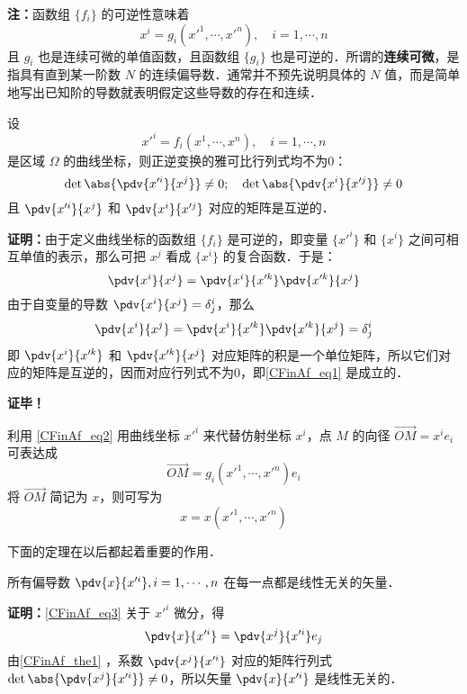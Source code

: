 \textbf{注：}函数组 $\{f_i\}$ 的可逆性意味着
\begin{equation}\label{CFinAf_eq2}
x^i=g_i(x'^1,\cdots,x'^n),\quad i=1,\cdots,n
\end{equation}
且 $g_i$ 也是连续可微的单值函数，且函数组 $\{g_i\}$ 也是可逆的．所谓的\textbf{连续可微}，是指具有直到某一阶数 $N$ 的连续偏导数．通常并不预先说明具体的 $N$ 值，而是简单地写出已知阶的导数就表明假定这些导数的存在和连续．
\begin{theorem}{}\label{CFinAf_the1}
设
\begin{equation}
x'^i=f_i(x^1,\cdots,x^n),\quad i=1,\cdots,n
\end{equation}
是区域 $\Omega$ 的曲线坐标，则正逆变换的雅可比行列式均不为0：
\begin{equation}\label{CFinAf_eq1}
\det\abs{\pdv{x'^i}{x^j}}\neq0;\quad\det\abs{\pdv{x^i}{x'^j}}\neq0
\end{equation}
且 $\pdv{x'^i}{x^j}$ 和 $\pdv{x^i}{x'^j}$ 对应的矩阵是互逆的．
\end{theorem}
\textbf{证明：}由于定义曲线坐标的函数组 $\{f_i\}$ 是可逆的，即变量 $\{x'^i\}$ 和 $\{x^i\}$ 之间可相互单值的表示，那么可把 $x^j$ 看成 $\{x^i\}$ 的复合函数．于是：
\begin{equation}
\pdv{x^i}{x^j}=\pdv{x^i}{x'^k}\pdv{x'^k}{x^j}
\end{equation}
由于自变量的导数 $\pdv{x^i}{x^j}=\delta^i_j$，那么
\begin{equation}
\pdv{x^i}{x^j}=\pdv{x^i}{x'^k}\pdv{x'^k}{x^j}=\delta^i_j
\end{equation}
即 $\pdv{x^i}{x'^k}$ 和 $\pdv{x'^k}{x^j}$ 对应矩阵的积是一个单位矩阵，所以它们对应的矩阵是互逆的，因而对应行列式不为0，即\autoref{CFinAf_eq1} 是成立的．

 
\textbf{证毕！}

利用 \autoref{CFinAf_eq2} 用曲线坐标 $x'^i$ 来代替仿射坐标 $x^i$，点 $M$ 的向径 $\overrightarrow {OM}=x^i e_i$ 可表达成
\begin{equation}\label{CFinAf_eq3}
\overrightarrow{OM}=g_i(x'^1,\cdots,x'^n)e_i
\end{equation}
将 $\overrightarrow{OM}$ 简记为 $x$，则可写为
\begin{equation}
x=x(x'^1,\cdots,x'^n)
\end{equation}

下面的定理在以后都起着重要的作用．
\begin{theorem}{}
所有偏导数 $\pdv{x}{x'^i},i=1,\cdots,n$ 在每一点都是线性无关的矢量．
\end{theorem}
\textbf{证明：}\autoref{CFinAf_eq3} 关于 $x'^i$ 微分，得
\begin{equation}
\pdv{x}{x'^i}=\pdv{x^j}{x'^i}e_j
\end{equation}
由\autoref{CFinAf_the1} ，系数 $\pdv{x^j}{x'^i}$ 对应的矩阵行列式 $\det\abs{\pdv{x^j}{x'^i}}\neq0$，所以矢量 $\pdv{x}{x'^i}$ 是线性无关的．


